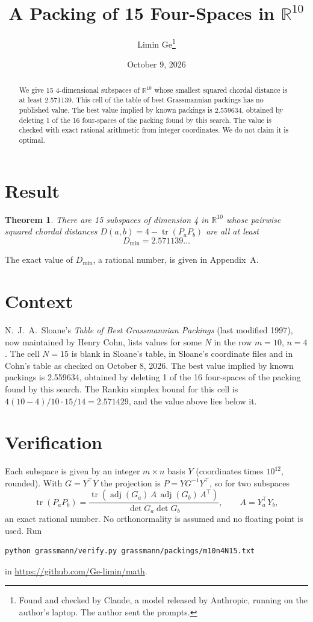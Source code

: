 \documentclass[11pt,a4paper]{article}
\title{A Packing of 15 Four-Spaces in $\mathbb{R}^{10}$}
\author{Limin Ge\thanks{Found and checked by Claude, a model released by Anthropic, running on the author's laptop. The author sent the prompts.}}
\date{October 9, 2026}
\newtheorem*{theorem}{Theorem}
\begin{document}
\maketitle
\begin{abstract}
We give 15 4-dimensional subspaces of $\mathbb{R}^{10}$ whose smallest squared chordal distance is at least 2.571139. This cell of the table of best Grassmannian packings has no published value. The best value implied by known packings is 2.559634, obtained by deleting 1 of the 16 four-spaces of the packing found by this search. The value is checked with exact rational arithmetic from integer coordinates. We do not claim it is optimal.
\end{abstract}

\section{Result}
\begin{theorem}
There are 15 subspaces of dimension 4 in $\mathbb{R}^{10}$ whose pairwise squared chordal distances $D(a,b) = 4 - \operatorname{tr}(P_aP_b)$ are all at least
\[ D_{\min} = 2.571139\ldots \]
\end{theorem}
The exact value of $D_{\min}$, a rational number, is given in Appendix~A.


\section{Context}
N.~J.~A.~Sloane's \emph{Table of Best Grassmannian Packings} (last modified 1997), now maintained by Henry Cohn, lists values for some $N$ in the row $m=10$, $n=4$. The cell $N=15$ is blank in Sloane's table, in Sloane's coordinate files and in Cohn's table as checked on October 8, 2026. The best value implied by known packings is 2.559634, obtained by deleting 1 of the 16 four-spaces of the packing found by this search. The Rankin simplex bound for this cell is $4(10-4)/10\cdot 15/14 = 2.571429$, and the value above lies below it.


\section{Verification}
Each subspace is given by an integer $m\times n$ basis $Y$ (coordinates times $10^{12}$, rounded). With $G=Y^\top Y$ the projection is $P=YG^{-1}Y^\top$, so for two subspaces
\[ \operatorname{tr}(P_aP_b)=\frac{\operatorname{tr}(\operatorname{adj}(G_a)\,A\,\operatorname{adj}(G_b)\,A^\top)}{\det G_a\det G_b},\qquad A=Y_a^\top Y_b, \]
an exact rational number. No orthonormality is assumed and no floating point is used. Run
\begin{verbatim}
python grassmann/verify.py grassmann/packings/m10n4N15.txt
\end{verbatim}
in \url{https://github.com/Ge-limin/math}.
\end{document}
